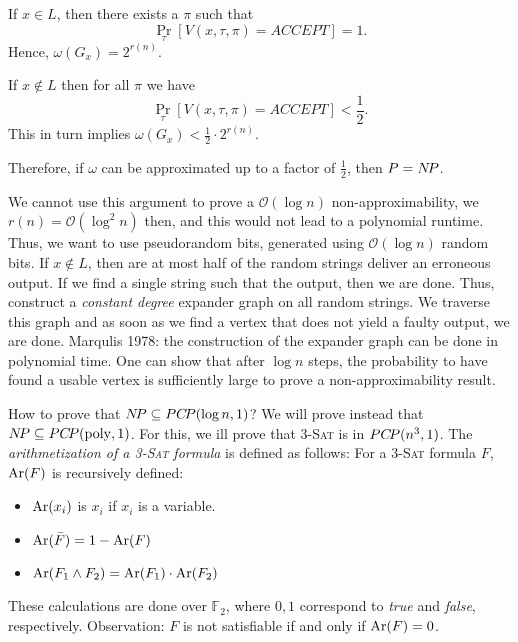 \documentclass[../skript.tex]{subfiles}
\begin{document}
If $x \in L$, then there exists a $\pi$ such that
\[
	\Pr_{\tau} \left[ V(x, \tau, \pi) = \textit{ACCEPT} \right] = 1.
\]
Hence, $\omega(G_x) = 2^{r(n)}$.

If $x \notin L$ then for all $\pi$ we have
\[
	\Pr_{\tau} \left[ V(x, \tau, \pi) = \textit{ACCEPT} \right] < \frac{1}{2}.
\]
This in turn implies $\omega(G_x) < \frac{1}{2} \cdot 2^{r(n)}$.

Therefore, if $\omega$ can be approximated up to a factor of $\frac{1}{2}$, then $P = N \! P$.

We cannot use this argument to prove a $\mathcal{O}(\log n)$ non-approximability, we $r(n) = \mathcal{O}(\log^2 n)$ then, and this would not lead to a polynomial runtime.
Thus, we want to use pseudorandom bits, generated using $\mathcal{O}(\log n)$ random bits.
If $x \notin L$, then are at most half of the random strings deliver an erroneous output. If we find a single string such that the output, then we are done.
Thus, construct a \emph{constant degree} expander graph on all random strings. We traverse this graph and as soon as we find a vertex that does not yield a faulty output, we are done.
Marqulis \lbrack{}1978\rbrack{}: the construction of the expander graph can be done in polynomial time. One can show that after $\log n$ steps, the probability to have found a usable vertex is sufficiently large to prove a non-approximability result.

How to prove that $N \! P \subseteq PC \! P(\log n, 1)$? We will prove instead that $N \! P \subseteq PC \! P(\operatorname{poly}, 1)$. For this, we ill prove that \textsc{3-Sat} is in $PC \! P(n^3, 1)$.
The \emph{arithmetization of a \textsc{3-Sat} formula} is defined as follows: For a \textsc{3-Sat} formula $F$, $\operatorname{Ar}(F)$ is recursively defined:
\begin{itemize}
\item $\operatorname{Ar}(x_i)$ is $x_i$ if $x_i$ is a variable.
\item $\operatorname{Ar}(\bar{F}) = 1 - \operatorname{Ar}(F)$
\item $\operatorname{Ar}(F_1 \wedge F_2) = \operatorname{Ar}(F_1) \cdot \operatorname{Ar}(F_2)$
\end{itemize}
These calculations are done over $\mathbb{F}_2$, where $0, 1$ correspond to \textit{true} and \textit{false}, respectively.
Observation: $F$ is not satisfiable if and only if $\operatorname{Ar}(F) = 0$.
\end{document}
